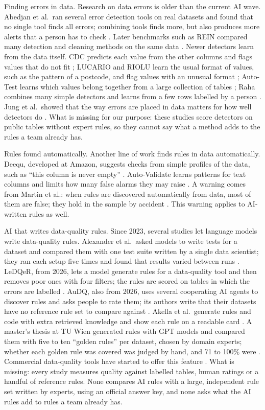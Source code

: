 \documentclass[11pt,a4paper]{article}
\begin{document}
Finding errors in data. Research on data errors is older than the current AI wave. Abedjan et al.\ ran several error detection tools on real datasets and found that no single tool finds all errors; combining tools finds more, but also produces more alerts that a person has to check \cite{abedjan}. Later benchmarks such as REIN compared many detection and cleaning methods on the same data \cite{rein}. Newer detectors learn from the data itself. CDC predicts each value from the other columns and flags values that do not fit \cite{cdc}; LUCARIO and RIOLU learn the usual format of values, such as the pattern of a postcode, and flag values with an unusual format \cite{lucario,riolu}; Auto-Test learns which values belong together from a large collection of tables \cite{autotest}; Raha combines many simple detectors and learns from a few rows labelled by a person \cite{raha}. Jung et al.\ showed that the way errors are placed in data matters for how well detectors do \cite{taberr}. What is missing for our purpose: these studies score detectors on public tables without expert rules, so they cannot say what a method adds to the rules a team already has.

Rules found automatically. Another line of work finds rules in data automatically. Deequ, developed at Amazon, suggests checks from simple profiles of the data, such as ``this column is never empty'' \cite{deequ}. Auto-Validate learns patterns for text columns and limits how many false alarms they may raise \cite{autovalidate}. A warning comes from Martin et al.: when rules are discovered automatically from data, most of them are false; they hold in the sample by accident \cite{martin}. This warning applies to AI-written rules as well.

AI that writes data-quality rules. Since 2023, several studies let language models write data-quality rules. Alexander et al.\ asked models to write tests for a dataset and compared them with one test suite written by a single data scientist; they ran each setup five times and found that results varied between runs \cite{alexander}. LeDQeR, from 2026, lets a model generate rules for a data-quality tool and then removes poor ones with four filters; the rules are scored on tables in which the errors are labelled \cite{ledqer}. AuDQ, also from 2026, uses several cooperating AI agents to discover rules and asks people to rate them; its authors write that their datasets have no reference rule set to compare against \cite{audq}. Akella et al.\ generate rules and code with extra retrieved knowledge and show each rule on a readable card \cite{akella}. A master's thesis at TU Wien generated rules with GPT models and compared them with five to ten ``golden rules'' per dataset, chosen by domain experts; whether each golden rule was covered was judged by hand, and 71 to 100\% were \cite{schneider}. Commercial data-quality tools have started to offer this feature \cite{rehberger}. What is missing: every study measures quality against labelled tables, human ratings or a handful of reference rules. None compares AI rules with a large, independent rule set written by experts, using an official answer key, and none asks what the AI rules add to rules a team already has.
\end{document}
